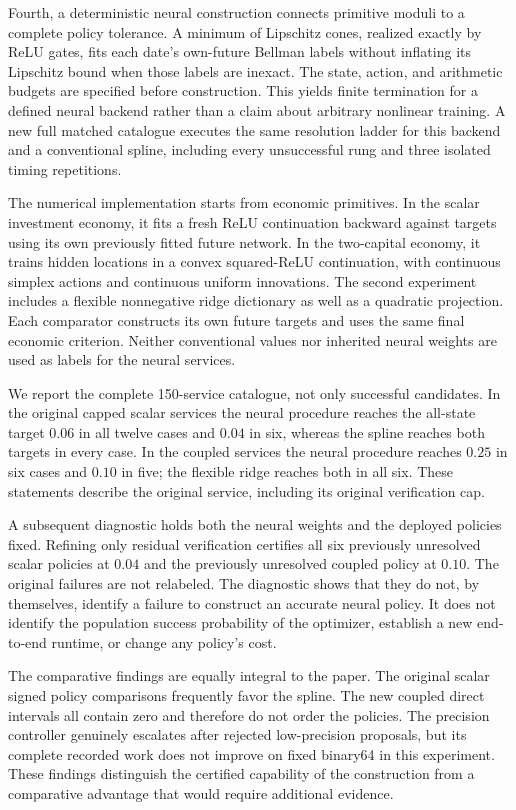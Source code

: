\documentclass[ecta,nameyear,draft]{econsocart}
\begin{document}
Fourth, a deterministic neural construction connects primitive moduli to a complete policy tolerance. A minimum of Lipschitz cones, realized exactly by ReLU gates, fits each date's own-future Bellman labels without inflating its Lipschitz bound when those labels are inexact. The state, action, and arithmetic budgets are specified before construction. This yields finite termination for a defined neural backend rather than a claim about arbitrary nonlinear training. A new full matched catalogue executes the same resolution ladder for this backend and a conventional spline, including every unsuccessful rung and three isolated timing repetitions.

The numerical implementation starts from economic primitives. In the scalar investment economy, it fits a fresh ReLU continuation backward against targets using its own previously fitted future network. In the two-capital economy, it trains hidden locations in a convex squared-ReLU continuation, with continuous simplex actions and continuous uniform innovations. The second experiment includes a flexible nonnegative ridge dictionary as well as a quadratic projection. Each comparator constructs its own future targets and uses the same final economic criterion. Neither conventional values nor inherited neural weights are used as labels for the neural services.

We report the complete 150-service catalogue, not only successful candidates. In the original capped scalar services the neural procedure reaches the all-state target $0.06$ in all twelve cases and $0.04$ in six, whereas the spline reaches both targets in every case. In the coupled services the neural procedure reaches $0.25$ in six cases and $0.10$ in five; the flexible ridge reaches both in all six. These statements describe the original service, including its original verification cap.

A subsequent diagnostic holds both the neural weights and the deployed policies fixed. Refining only residual verification certifies all six previously unresolved scalar policies at $0.04$ and the previously unresolved coupled policy at $0.10$. The original failures are not relabeled. The diagnostic shows that they do not, by themselves, identify a failure to construct an accurate neural policy. It does not identify the population success probability of the optimizer, establish a new end-to-end runtime, or change any policy's cost.

The comparative findings are equally integral to the paper. The original scalar signed policy comparisons frequently favor the spline. The new coupled direct intervals all contain zero and therefore do not order the policies. The precision controller genuinely escalates after rejected low-precision proposals, but its complete recorded work does not improve on fixed binary64 in this experiment. These findings distinguish the certified capability of the construction from a comparative advantage that would require additional evidence.
\end{document}
